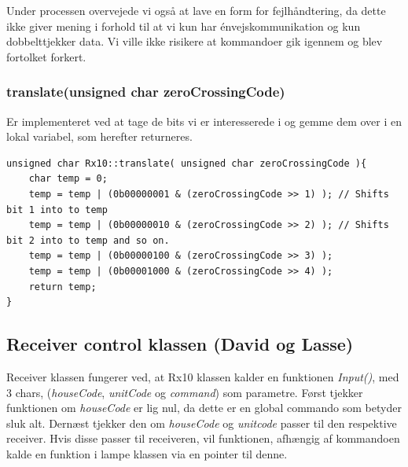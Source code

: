 Under processen overvejede vi også at lave en form for fejlhåndtering, da dette ikke giver mening i forhold til at vi kun har énvejskommunikation og kun dobbelttjekker data. Vi ville ikke risikere at kommandoer gik igennem og blev fortolket forkert.

\subsubsection{translate(unsigned char zeroCrossingCode)}

Er implementeret ved at tage de bits vi er interesserede i og gemme dem over i en lokal variabel, som herefter returneres.

\begin{lstlisting}
unsigned char Rx10::translate( unsigned char zeroCrossingCode ){
	char temp = 0;
	temp = temp | (0b00000001 & (zeroCrossingCode >> 1) ); // Shifts bit 1 into to temp
	temp = temp | (0b00000010 & (zeroCrossingCode >> 2) ); // Shifts bit 2 into to temp and so on.
	temp = temp | (0b00000100 & (zeroCrossingCode >> 3) );
	temp = temp | (0b00001000 & (zeroCrossingCode >> 4) );
	return temp;
}
\end{lstlisting}

\subsection{Receiver control klassen (David og Lasse)}

Receiver klassen fungerer ved, at Rx10 klassen kalder en funktionen \textit{Input()}, med 3 chars, (\textit{houseCode}, \textit{unitCode} og \textit{command}) som parametre. 
Først tjekker funktionen om \textit{houseCode} er lig nul, da dette er en global commando som betyder sluk alt. Dernæst tjekker den om \textit{houseCode} og \textit{unitcode} passer til den respektive receiver. Hvis disse passer til receiveren, vil funktionen, afhængig af kommandoen kalde en funktion i lampe klassen via en pointer til denne.